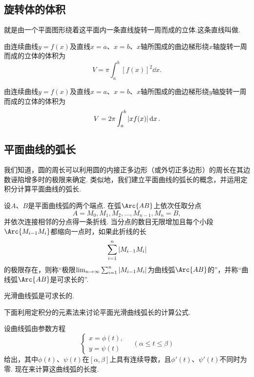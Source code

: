 \subsection{旋转体的体积}
\begin{definition}[旋转体]
就是由一个平面图形绕着这平面内一条直线旋转一周而成的立体.这条直线叫做.
\end{definition}

由连续曲线\(y=f(x)\)及直线\(x=a\)、\(x=b\)、\(x\)轴所围成的曲边梯形绕\(x\)轴旋转一周而成的立体的体积为
\begin{equation}\label{equation:定积分.曲边梯形绕x轴旋转体的体积}
V = \pi \int_a^b [f(x)]^2 \dd{x}.
\end{equation}

由连续曲线\(y=f(x)\)及直线\(x=a\)、\(x=b\)、\(x\)轴所围成的曲边梯形绕\(y\)轴旋转一周而成的立体的体积为
\begin{equation}\label{equation:定积分.曲边梯形绕y轴旋转体的体积}
V = 2\pi \int_a^b \abs{x f(x)} \dd{x}.
\end{equation}

\subsection{平面曲线的弧长}
我们知道，圆的周长可以利用圆的内接正多边形（或外切正多边形）的周长在其边数诬陷增多时的极限来确定.
类似地，我们建立平面曲线的弧长的概念，并运用定积分计算平面曲线的弧长.

设\(A\)、\(B\)是平面曲线弧的两个端点.
在弧\(\Arc{AB}\)上依次任取分点\[
A=M_0,M_1,M_2,\dotsc,M_{n-1},M_n=B,
\]并依次连接相邻的分点得一条折线.
当分点的数目无限增加且每个小段\(\Arc{M_{i-1}M_i}\)都缩向一点时，如果此折线的长\[
\sum_{i=1}^n \abs{M_{i-1} M_i}
\]的极限存在，则称“极限\(\lim_{n\to\infty} \sum_{i=1}^n \abs{M_{i-1} M_i}\)为曲线弧\(\Arc{AB}\)的”，并称“曲线弧\(\Arc{AB}\)是可求长的”.

\begin{theorem}
光滑曲线弧是可求长的.
\end{theorem}

下面利用定积分的元素法来讨论平面光滑曲线弧长的计算公式.

设曲线弧由参数方程\[
\left\{ \begin{array}{l}
x = \phi(t), \\
y = \psi(t)
\end{array} \right.
\quad(\alpha \leq t \leq \beta)
\]给出，其中\(\phi(t)\)、\(\psi(t)\)在\([\alpha,\beta]\)上具有连续导数，且\(\phi'(t)\)、\(\psi'(t)\)不同时为零.
现在来计算这曲线弧的长度.

